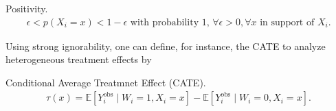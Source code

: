 \begin{assump}{Positivity.}
   \label{assump:overlap} 
   \begin{align*}
   \epsilon < p(X_i=x) < 1 - \epsilon \text{ with probability 1, } \forall   \epsilon>0 , \forall x \text{ in support of } X_i.
   \end{align*}
\end{assump}

 
Using strong ignorability, one can define, for instance, the CATE to analyze heterogeneous treatment effects by

\begin{defn}{Conditional Average Treatmnet Effect (CATE).}
   \label{defn:CATE} \\
   \begin{align*}
      \tau(x) = \mathbb{E}[Y_i^{\text{obs}} \mid W_i = 1, X_i = x] - \mathbb{E}[Y_i^{\text{obs}} \mid W_i = 0, X_i = x].   
   \end{align*}
\end{defn}

